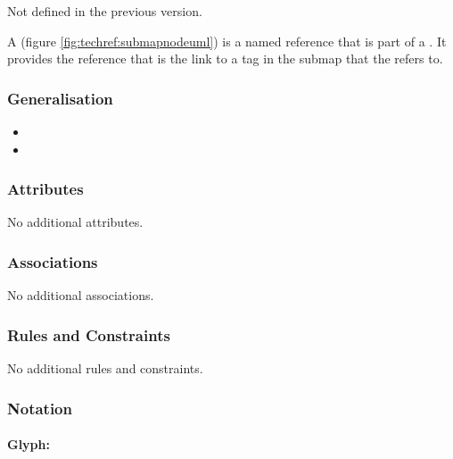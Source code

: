 Not defined in the previous version.

\label{defn:SubmapTerminal}

A  (figure \ref{fig:techref:submapnodeuml}) is a named reference that is part of a
. It provides the reference that is the link to a
tag in the submap that the  refers to.

\subsubsection{Generalisation}

\begin{itemize}
\item {}
\item {}
\end{itemize}

\subsubsection{Attributes}

No additional attributes.

\subsubsection{Associations}

No additional associations.

\subsubsection{Rules and Constraints}

No additional rules and constraints.

\subsubsection{Notation}

\paragraph{Glyph: }

